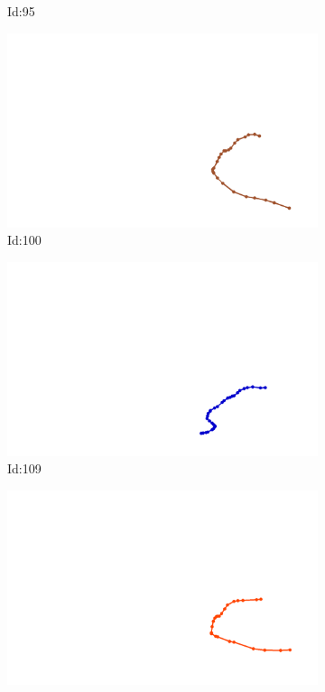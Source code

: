 \documentclass[12pt,twoside]{report}
\begin{document}
\begin{figure}
\begin{subfigure}[b]{0.20\textwidth}
\caption{Id:95}
\end{subfigure}
\begin{subfigure}[b]{0.20\textwidth}
\centering
\includegraphics[width=\textwidth]{../trajectories/100.png}
\caption{Id:100}
\end{subfigure}
\begin{subfigure}[b]{0.20\textwidth}
\centering
\includegraphics[width=\textwidth]{../trajectories/109.png}
\caption{Id:109}
\end{subfigure}
\begin{subfigure}[b]{0.20\textwidth}
\centering
\includegraphics[width=\textwidth]{../trajectories/111.png}

\end{subfigure}
\end{figure}
\end{document}
